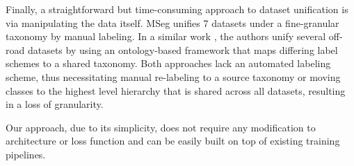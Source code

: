 Finally, a straightforward but time-consuming approach to dataset unification is via manipulating the data itself.
MSeg \cite{bib:mseg} unifies 7 datasets under a fine-granular taxonomy by manual labeling.
In a similar work \cite{bib:unifying-off-road}, the authors unify several off-road datasets by using an ontology-based framework that maps differing label schemes to a shared taxonomy. 
Both approaches lack an automated labeling scheme, thus necessitating manual re-labeling to a source taxonomy or moving classes to the highest level hierarchy that is shared across all datasets, resulting in a loss of granularity.

Our approach, due to its simplicity, does not require any modification to architecture or loss function and can be easily built on top of existing training pipelines.